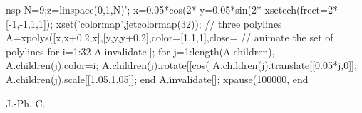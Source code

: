 \begin{examples}
  \begin{mintednsp}{nsp}
    N=9;z=linspace(0,1,N)';
    x=0.05*cos(2*%
    y=0.05*sin(2*%
    xsetech(frect=2*[-1,-1,1,1]);
    xset('colormap',jetcolormap(32));
    // three polylines
    A=xpolys([x,x+0.2,x],[y,y,y+0.2],color=[1,1,1],close=%
    // animate the set of polylines
    for i=1:32
      A.invalidate[];
      for j=1:length(A.children),
        A.children(j).color=i;
        A.children(j).rotate[[cos(%
        A.children(j).translate[[0.05*j,0]];
        A.children(j).scale[[1.05,1.05]];
      end
      A.invalidate[];
      xpause(100000,%
    end
  \end{mintednsp}
\end{examples}
\begin{manseealso}
    
\end{manseealso}
\begin{authors}
  J.-Ph. C.
\end{authors}
